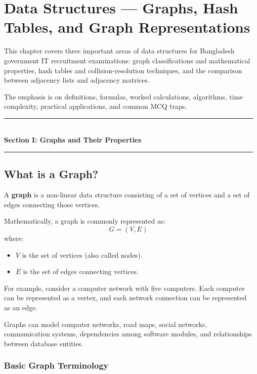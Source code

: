 \chapter{Data Structures --- Graphs, Hash Tables, and Graph Representations}
\label{ch:graphs_hashing}

This chapter covers three important areas of data structures for Bangladesh government IT recruitment examinations: graph classifications and mathematical properties, hash tables and collision-resolution techniques, and the comparison between adjacency lists and adjacency matrices.

The emphasis is on definitions, formulas, worked calculations, algorithms, time complexity, practical applications, and common MCQ traps.

\begin{center}
\vspace{0.5em}
{\color{primary}\rule{0.45\textwidth}{1.2pt}}\\[4pt]
{\Large\bfseries\color{primary} Section I: Graphs and Their Properties}\\[2pt]
{\color{primary}\rule{0.45\textwidth}{1.2pt}}
\vspace{0.5em}
\end{center}

\section{What is a Graph?}

A \textbf{graph} is a non-linear data structure consisting of a set of vertices and a set of edges connecting those vertices.

Mathematically, a graph is commonly represented as:
\[
G = (V, E)
\]
where:
\begin{itemize}
    \item $V$ is the set of vertices (also called nodes).
    \item $E$ is the set of edges connecting vertices.
\end{itemize}

For example, consider a computer network with five computers. Each computer can be represented as a vertex, and each network connection can be represented as an edge.

Graphs can model computer networks, road maps, social networks, communication systems, dependencies among software modules, and relationships between database entities.

\subsection{Basic Graph Terminology}

